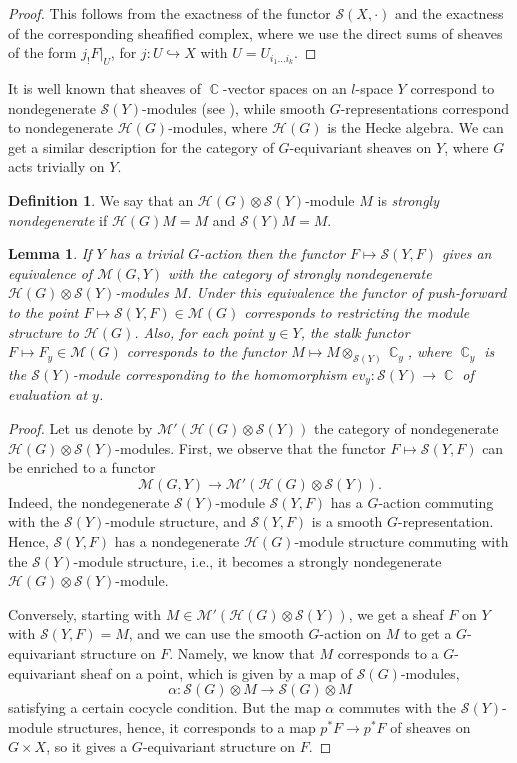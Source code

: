 \documentclass[12pt,reqno]{amsart}
\DeclareMathOperator\C{\mathbb C}
\newtheorem{lemma}[theorem]{Lemma}
\theoremstyle{definition}
\newtheorem{definition}[theorem]{Definition}
\theoremstyle{remark}
\numberwithin{equation}{section}
\newcommand{\hra}{\hookrightarrow}
\newcommand{\ot}{\otimes}
\renewcommand{\SS}{{\mathcal S}}
\newcommand{\HH}{{\mathcal H}}
\newcommand{\MM}{{\mathcal M}}
\renewcommand{\a}{\alpha}
\begin{document}
\begin{proof} This follows from the exactness of the functor $\SS(X,\cdot)$ and the exactness of the corresponding sheafified complex,
where we use the direct sums of sheaves of the form $j_!F|_U$, for $j:U\hra X$ with $U=U_{i_1\ldots i_k}$.
\end{proof}

It is well known that sheaves of $\C$-vector spaces on an $l$-space $Y$ correspond to nondegenerate $\SS(Y)$-modules (see \cite[Sec.\ 1.3]{Bern}), while
smooth $G$-representations correspond to nondegenerate $\HH(G)$-modules, where $\HH(G)$ is the Hecke algebra.
We can get a similar description for the category of $G$-equivariant sheaves on $Y$, where $G$ acts trivially on $Y$.

\begin{definition}
We say that an $\HH(G)\ot\SS(Y)$-module $M$ is {\it strongly nondegenerate}
if $\HH(G)M=M$ and $\SS(Y)M=M$.
\end{definition}

\begin{lemma}
If $Y$ has a trivial $G$-action then the functor $F\mapsto \SS(Y,F)$ gives an equivalence
of $\MM(G,Y)$ with the category of strongly nondegenerate $\HH(G)\ot \SS(Y)$-modules $M$. 
Under this equivalence the functor of push-forward to the point $F\mapsto \SS(Y,F)\in \MM(G)$ corresponds to restricting the module structure
to $\HH(G)$. Also, for each point $y\in Y$, the stalk functor $F\mapsto F_y\in \MM(G)$ corresponds to the functor 
$M\mapsto M\ot_{\SS(Y)}\C_y$, where $\C_y$ is the $\SS(Y)$-module corresponding to the homomorphism $ev_y:\SS(Y)\to \C$
of evaluation at $y$. 
\end{lemma}

\begin{proof} 
Let us denote by $\MM'(\HH(G)\ot\SS(Y))$ the category of nondegenerate $\HH(G)\ot\SS(Y)$-modules.
First, we observe that the functor $F\mapsto \SS(Y,F)$ can be enriched to a functor 
$$\MM(G,Y)\to \MM'(\HH(G)\ot\SS(Y)).$$
Indeed, the nondegenerate $\SS(Y)$-module $\SS(Y,F)$ has a $G$-action commuting with the $\SS(Y)$-module structure, and
$\SS(Y,F)$ is a smooth $G$-representation. 
Hence, $\SS(Y,F)$ has a nondegenerate $\HH(G)$-module structure commuting with the $\SS(Y)$-module structure, i.e., it becomes
a strongly nondegenerate $\HH(G)\ot\SS(Y)$-module.

Conversely, starting with $M\in \MM'(\HH(G)\ot\SS(Y))$, we get a sheaf $F$ on $Y$ with $\SS(Y,F)=M$, and we can use the smooth $G$-action on $M$
to get a $G$-equivariant structure on $F$. Namely, we know that $M$ corresponds to a $G$-equivariant sheaf on a point, which is given by a map of $\SS(G)$-modules,
$$\a:\SS(G)\ot M\to \SS(G)\ot M$$ 
satisfying a certain cocycle condition. But the map $\a$ commutes with the $\SS(Y)$-module structures, hence, it corresponds to a map $p^*F\to p^*F$ of sheaves on $G\times X$,
so it gives a $G$-equivariant structure on $F$.
\end{proof}
\end{document}
